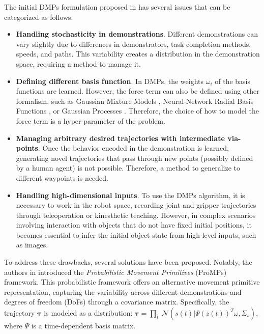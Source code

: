 The initial DMPs formulation proposed in \cite{ijspeert2002learning} has several issues that can be categorized as follows:
\begin{itemize}
    \item \textbf{Handling stochasticity in demonstrations}. Different demonstrations can vary slightly due to differences in demonstrators, task completion methods, speeds, and paths. This variability creates a distribution in the demonstration space, requiring a method to manage it.
    
    \item \textbf{Defining different basis function}. In DMPs, the weights $\omega_{i}$ of the basis functions are learned. However, the force term can also be defined using other formalism, such as Gaussian Mixture Models \cite{si2023composite}, Neural-Network Radial Basis Functions \cite{li2023human}, or Gaussian Processes \cite{fanger2016gaussian}. Therefore, the choice of how to model the force term is a hyper-parameter of the problem.

    \item \textbf{Managing arbitrary desired trajectories with intermediate via-points}. Once the behavior encoded in the demonstration is learned, generating novel trajectories that pass through new points (possibly defined by a human agent) is not possible. Therefore, a method to generalize to different waypoints is needed.
    
    \item \textbf{Handling high-dimensional inputs}. To use the DMPs algorithm, it is necessary to work in the robot space, recording joint and gripper trajectories through teleoperation or kinesthetic teaching. However, in complex scenarios involving interaction with objects that do not have fixed initial positions, it becomes essential to infer the initial object state from high-level inputs, such as images.
\end{itemize}
To address these drawbacks, several solutions have been proposed. Notably, the authors in \cite{paraschos2013ProMPs} introduced the \textit{Probabilistic Movement Primitives} (ProMPs) framework. This probabilistic framework offers an alternative movement primitive representation, capturing the variability across different demonstrations and degrees of freedom (DoFs) through a covariance matrix. Specifically, the trajectory $\mathbf{\tau}$ is modeled as a distribution: $\boldsymbol{\tau} = \underset{t}{\prod} \ \mathcal{N}(s(t)|\Psi(z(t))^{T}\omega, \Sigma_{s})$, where $\Psi$ is a time-dependent basis matrix.

